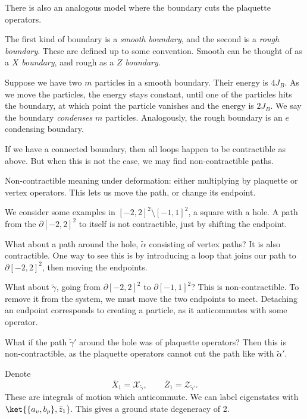 \documentclass[12pt]{article}
\begin{document}
There is also an analogous model where the boundary cuts the plaquette operators.

The first kind of boundary is a \emph{smooth boundary}, and the second is a \emph{rough boundary}. These are defined up to some convention. Smooth can be thought of as a \emph{$X$ boundary}, and rough as a \emph{$Z$ boundary}.

Suppose we have two $m$ particles in a smooth boundary. Their energy is $4 J_B$. As we move the particles, the energy stays constant, until one of the particles hits the boundary, at which point the particle vanishes and the energy is $2 J_B$. We say the boundary \emph{condenses} $m$ particles. Analogously, the rough boundary is an $e$ condensing boundary.

If we have a connected boundary, then all loops happen to be contractible as above. But when this is not the case, we may find non-contractible paths.

Non-contractible meaning under deformation: either multiplying by plaquette or vertex operators. This lets us move the path, or change its endpoint.

We consider some examples in $[-2, 2]^2 \setminus [-1, 1]^2$, a square with a hole. A path from the $\partial [-2, 2]^2$ to itself is not contractible, just by shifting the endpoint.

What about a path around the hole, $\tilde \alpha$ consisting of vertex paths? It is also contractible. One way to see this is by introducing a loop that joins our path to $\partial [-2, 2]^2$, then moving the endpoints.

What about $\tilde \gamma$, going from $\partial [-2, 2]^2$ to $\partial [-1, 1]^2$? This is non-contractible. To remove it from the system, we must move the two endpoints to meet. Detaching an endpoint corresponds to creating a particle, as it anticommutes with some operator.

What if the path $\tilde \gamma'$ around the hole was of plaquette operators? Then this is non-contractible, as the plaquette operators cannot cut the path like with $\tilde \alpha'$.

Denote
\[
\bar X_{1} = \mathcal{X}_{\tilde \gamma}, \qquad \bar Z_1 = \mathcal{Z}_{\tilde \gamma'}.
\]
These are integrals of motion which anticommute. We can label eigenstates with $\ket{\{a_v, b_p\}, \bar z_1}$. This gives a ground state degeneracy of 2.
\end{document}
